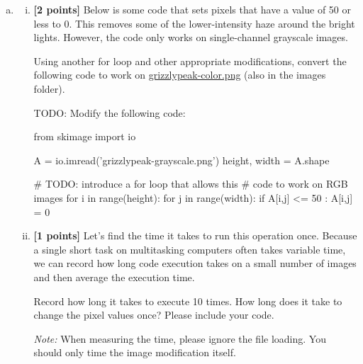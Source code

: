 \documentclass[11pt]{article}
\begin{document}
\begin{enumerate}[(a)]
    \item 
    \begin{enumerate}[(i)] 
        \item \textbf{[2 points]}
Below is some code that sets pixels that have a value of 50 or less to 0. This removes some of the lower-intensity haze around the bright lights. However, the code only works on single-channel grayscale images.

\begin{tcolorbox}[colback=orange!5!white,colframe=orange!75!black]
Using another for loop and other appropriate modifications, convert the following code to work on \href{run:images/grizzlypeak-color.png}{grizzlypeak-color.png} (also in the images folder).
\end{tcolorbox}

\begin{tcolorbox}[enhanced jigsaw,pad at break*=1mm,colback=white!5!white,colframe=green!75!black,height=10cm]
    TODO: Modify the following code:
    \begin{python}
    from skimage import io

    A = io.imread('grizzlypeak-grayscale.png')
    height, width = A.shape

    # TODO: introduce a for loop that allows this 
    # code to work on RGB images
    for i in range(height):
        for j in range(width):
            if A[i,j] <= 50 :
                A[i,j] = 0
    \end{python}
    

\end{tcolorbox}

\item
\textbf{[1 points]} Let's find the time it takes to run this operation once. Because a single short task on multitasking computers often takes variable time, we can record how long code execution takes on a small number of images and then average the execution time.

\begin{tcolorbox}[colback=orange!5!white,colframe=orange!75!black]
Record how long it takes to execute 10 times. How long does it take to change the pixel values once? Please include your code.
\end{tcolorbox}

\emph{Note: } When measuring the time, please ignore the file loading. You should only time the image modification itself.


\end{enumerate}
\end{enumerate}
\end{document}
